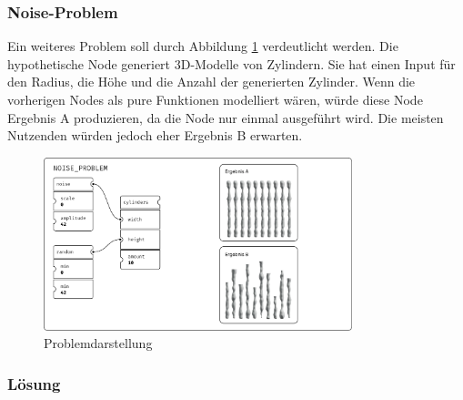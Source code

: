 \documentclass[ngerman]{article}
\begin{document}
\pagebreak

\subsubsection*{Noise-Problem}

Ein weiteres Problem soll durch Abbildung \ref{fig:noise_problem} verdeutlicht werden. 
Die hypothetische  Node generiert 3D-Modelle von Zylindern. Sie hat einen Input für den Radius, die Höhe und die Anzahl der generierten Zylinder. 
\br
Wenn die vorherigen Nodes als pure Funktionen modelliert wären, würde diese Node Ergebnis A produzieren, da die  Node nur einmal ausgeführt wird. Die meisten Nutzenden würden jedoch eher Ergebnis B erwarten.

\begin{figure}[htbp]
  \centering
  \includegraphics[width=0.8\textwidth]{./graphics/NOISE_PROBLEM.pdf}
  \caption{Problemdarstellung}
  \label{fig:noise_problem}
\end{figure}

\subsubsection*{Lösung}
\end{document}

